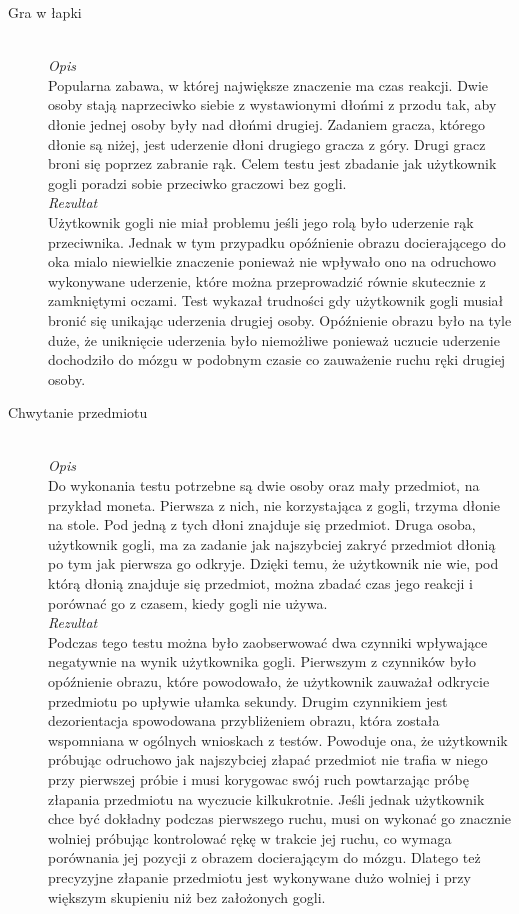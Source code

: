 \documentclass[a4paper,11pt,twoside]{report}
\theoremstyle{definition}
\begin{document}
\begin{description}
\item[Gra w łapki] \hfill \\
\textit{Opis} \\
Popularna zabawa, w której największe znaczenie ma czas reakcji. Dwie osoby stają naprzeciwko siebie z wystawionymi dłońmi z przodu tak, aby dłonie jednej osoby były nad dłońmi drugiej. Zadaniem gracza, którego dłonie są niżej, jest uderzenie dłoni drugiego gracza z góry. Drugi gracz broni się poprzez zabranie rąk. Celem testu jest zbadanie jak użytkownik gogli poradzi sobie przeciwko graczowi bez gogli. \\
\textit{Rezultat}\\
Użytkownik gogli nie miał problemu jeśli jego rolą było uderzenie rąk przeciwnika. Jednak w tym przypadku opóźnienie obrazu docierającego do oka mialo niewielkie znaczenie ponieważ nie wpływało ono na odruchowo wykonywane uderzenie, które można przeprowadzić równie skutecznie z zamkniętymi oczami. Test wykazał trudności gdy użytkownik gogli musiał bronić się unikając uderzenia drugiej osoby. Opóźnienie obrazu było na tyle duże, że uniknięcie uderzenia było niemożliwe ponieważ uczucie uderzenie dochodziło do mózgu w podobnym czasie co zauważenie ruchu ręki drugiej osoby.

\item[Chwytanie przedmiotu] \hfill \\
\textit{Opis} \\
Do wykonania testu potrzebne są dwie osoby oraz mały przedmiot, na przykład moneta. Pierwsza z nich, nie korzystająca z gogli, trzyma dłonie na stole. Pod jedną z tych dłoni znajduje się przedmiot. Druga osoba, użytkownik gogli, ma za zadanie jak najszybciej zakryć przedmiot dłonią po tym jak pierwsza go odkryje. Dzięki temu, że użytkownik nie wie, pod którą dłonią znajduje się przedmiot, można zbadać czas jego reakcji i porównać go z czasem, kiedy gogli nie używa. \\
\textit{Rezultat} \\
Podczas tego testu można było zaobserwować dwa czynniki wpływające negatywnie na wynik użytkownika gogli. Pierwszym z czynników było opóźnienie obrazu, które powodowało, że użytkownik zauważał odkrycie przedmiotu po upływie ułamka sekundy. Drugim czynnikiem jest dezorientacja spowodowana przybliżeniem obrazu, która została wspomniana w ogólnych wnioskach z testów. Powoduje ona, że użytkownik próbując odruchowo jak najszybciej złapać przedmiot nie trafia w niego przy pierwszej próbie i musi korygowac swój ruch powtarzając próbę złapania przedmiotu na wyczucie kilkukrotnie. Jeśli jednak użytkownik chce być dokładny podczas pierwszego ruchu, musi on wykonać go znacznie wolniej próbując kontrolować rękę w trakcie jej ruchu, co wymaga porównania jej pozycji z obrazem docierającym do mózgu. Dlatego też precyzyjne złapanie przedmiotu jest wykonywane dużo wolniej i przy większym skupieniu niż bez założonych gogli.


\end{description}
\end{document}
